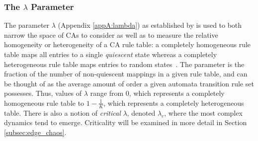 \documentclass[a4paper,11pt]{article}
\begin{document}


\subsubsection*{The $\lambda$ Parameter}

The parameter $\lambda$ (Appendix \ref{appA:lambda}) as established by \citeauthor{la90} is used to both narrow the space of CAs to consider as well as to measure the relative homogeneity or heterogeneity of a CA rule table: a completely homogeneous rule table maps all entries to a single \textit{quiescent} state whereas a completely heterogeneous rule table maps entries to random states~\cite{la90}. The parameter is the fraction of the number of non-quiescent mappings in a given rule table, and can be thought of as the average amount of order a given automata transition rule set possesses. Thus, values of $\lambda$ range from $0$, which represents a completely homogeneous rule table to $1 - \frac{1}{K}$, which represents a completely heterogeneous table. There is also a notion of \textit{critical} $\lambda$, denoted $\lambda_c$, where the most complex dynamics tend to emerge. Criticality will be examined in more detail in Section \ref{subsec:edge_chaos}.
\end{document}
